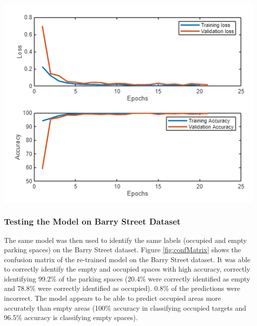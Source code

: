 \documentclass[man]{apa7}
\begin{document}
\begin{minipage}{\linewidth}
  \includegraphics[height=\textheight/4,width=\textwidth/2]{figures/carDetector.png}
  \label{fig:modelTraining}
\end{minipage}

\subsubsection{Testing the Model on Barry Street Dataset}
The same model was then used to identify the same labels (occupied and empty parking spaces) on the Barry Street dataset. Figure \ref{fig:confMatrix} shows the confusion matrix of the re-trained model on the Barry Street dataset. It was able to correctly identify the empty and occupied spaces with high accuracy, correctly identifying 99.2\% of the parking spaces (20.4\% were correctly identified as empty and 78.8\% were correctly identified as occupied). 0.8\% of the predictions were incorrect. The model appears to be able to predict occupied areas more accurately than empty areas (100\% accuracy in classifying occupied targets and 96.5\% accuracy is classifying empty spaces).
\end{document}

